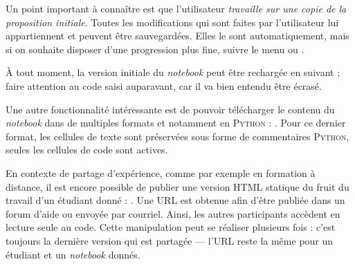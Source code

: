 \vspace*{-2pt}

Un point important à connaître est que l'utilisateur \emph{travaille sur une copie de la proposition initiale}. Toutes les modifications qui sont faites par l'utilisateur lui appartiennent et peuvent être sauvegardées. Elles le sont automatiquement, mais si on souhaite disposer d'une progression plus fine, suivre le menu  ou .

À tout moment, la version initiale du \textit{notebook} peut être rechargée en suivant  ; faire attention au code saisi auparavant, car il va bien entendu être écrasé.

Une autre fonctionnalité intéressante est de pouvoir télécharger le contenu du \textit{notebook} dans de multiples formats et notamment en \textsc{Python} : . Pour ce dernier format, les cellules de texte sont préservées sous forme de commentaires \textsc{Python}, seules les cellules de code sont actives.

En contexte de partage d'expérience, comme par exemple en formation à distance, il est encore possible de publier une version HTML statique du fruit du travail d'un étudiant donné : . Une URL est obtenue afin d'être publiée dans un forum d'aide ou envoyée par courriel. Ainsi, les autres participants accèdent en lecture seule au code. Cette manipulation peut se réaliser plusieurs fois : c'est toujours la dernière version qui est partagée --- l'URL reste la même pour un étudiant et un \textit{notebook} donnés.

